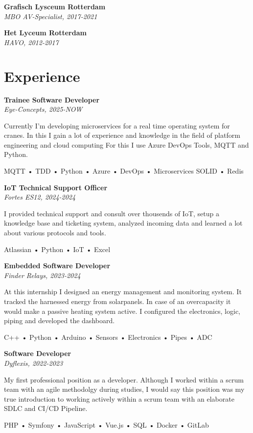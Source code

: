 \documentclass[11pt, twoside, a4paper, titlepage]{article}
\begin{document}
\begin{tcolorbox}[boxsep=0mm, left=0mm, right=0mm, top=0mm, bottom=0mm, height=23cm]
\begin{minipage}[t]{14cm}
\begin{tcolorbox}[grow to left by=0.0cm, colframe=white, colback=white, height=22.9cm]
			\vspace*{0.3cm}
			
			\textbf{Grafisch Lysceum Rotterdam}\\
			\emph{MBO AV-Specialist, 2017-2021}
			
			\vspace*{0.3cm}
			
			\textbf{Het Lyceum Rotterdam}\\
			\emph{HAVO, 2012-2017}
			
			\section*{Experience}
			\textbf{Trainee Software Developer}\\
			\emph{Eye-Concepts, 2025-NOW}\\
			\parbox{13cm}{Currently I'm developing microservices for a real time operating system for cranes. In this I gain a lot of experience and knowledge in the field of platform engineering and cloud computing For this I use Azure DevOps Tools, MQTT and Python.}
			\parbox{13cm}{ MQTT • TDD • Python • Azure • DevOps • Microservices SOLID • Redis }
			
			\vspace*{0.3cm}
			
			\textbf{IoT Technical Support Officer}\\
			\emph{Fortes ES12, 2024-2024}\\
			\parbox{13cm}{I provided technical support and consult over thousends of IoT, setup a knowledge base and ticketing system, analyzed incoming data and learned a lot about various protocols and tools.}
			\parbox{13cm}{ Atlassian • Python • IoT • Excel }
			
			\vspace*{0.3cm}
			
			\textbf{Embedded Software Developer}\\
			\emph{Finder Relays, 2023-2024}\\
			\parbox{13cm}{At this internship I designed an energy management and monitoring system. It tracked the harnessed energy from solarpanels. In case of an overcapacity it would make a passive heating system active. I configured the electronics, logic, piping and developed the dashboard.}
			\parbox{13cm}{ C++ • Python • Arduino • Sensors • Electronics • Pipes • ADC }
			
			\vspace*{0.3cm}
			
			\textbf{Software Developer}\\
			\emph{Dyflexis, 2022-2023}\\
			\parbox{13cm}{My first professional position as a developer. Although I worked within a scrum team with an agile methodolgy during studies, I would say this position was my true introduction to working actively within a scrum team with an elaborate SDLC and CI/CD Pipeline.}
			\parbox{13cm}{ PHP • Symfony • JavaScript • Vue.js • SQL • Docker • GitLab }
			

\end{tcolorbox}
\end{minipage}
\end{tcolorbox}
\end{document}
